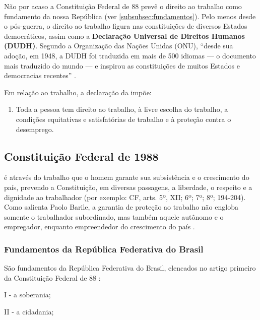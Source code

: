 \documentclass[
	10pt,				%
	openright,			%
	twoside,			%
	a5paper,			%
	english,			%
	french,				%
	spanish,			%
	brazil				%
	]{abntex2}
\renewenvironment{quote}
  {\small\list{}{\rightmargin=0.1cm \leftmargin=4cm}%
   \item\relax}
  {\endlist}
\begin{document}
Não por acaso a Constituição Federal de 88 prevê o direito ao trabalho
como fundamento da nossa República (ver
\autoref{subsubsec:fundamentos}). Pelo menos desde o pós-guerra, o
direito ao trabalho figura nas constituições de diversos Estados
democráticos, assim como a \textbf{Declaração Universal de Direitos
Humanos (DUDH)}. Segundo a Organização das Nações Unidas (ONU), ``desde
sua adoção, em 1948, a DUDH foi traduzida em mais de 500 idiomas --- o
documento mais traduzido do mundo --- e inspirou as constituições de
muitos Estados e democracias recentes'' \cite{dudh}.

Em relação ao trabalho, a declaração da 
impõe:

\begin{enumerate}
\def\labelenumi{\arabic{enumi})}
\tightlist
\item
  Toda a pessoa tem direito ao trabalho, à livre escolha do trabalho, a
  condições equitativas e satisfatórias de trabalho e à proteção contra
  o desemprego.
\end{enumerate}

\subsection{Constituição Federal de
1988}\label{constituiuxe7uxe3o-federal-de-1988}

\begin{quote}
é através do trabalho que o homem garante sua subsistência e o
crescimento do país, prevendo a Constituição, em diversas passagens, a
liberdade, o respeito e a dignidade ao trabalhador (por exemplo: CF,
arts. 5º, XII; 6º; 7º; 8º; 194-204). Como salienta Paolo Barile, a
garantia de proteção ao trabalho não engloba somente o trabalhador
subordinado, mas também aquele autônomo e o empregador, enquanto
empreendedor do crescimento do país .
\end{quote}

\subsubsection{Fundamentos da República Federativa do
Brasil}\label{subsubsec:fundamentos}

São fundamentos da República Federativa do Brasil, elencados no artigo
primeiro da Constituição Federal de 88 \cite[grifo nosso]{cf88}:

I - a soberania;

II - a cidadania;
\end{document}
